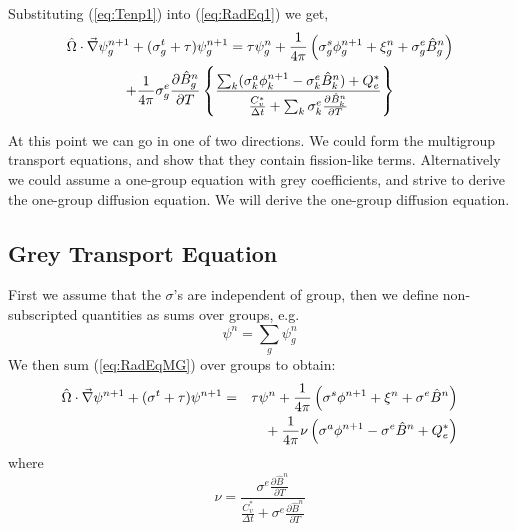 \documentclass{article}
\newcommand{\dt}{\ensuremath{\Delta t}}
\newcommand{\Cvs}{\ensuremath{C_{v}^{*}}}
\newcommand{\Bn}{\ensuremath{\hat{B}^{n}}}
\newcommand{\pBndT}{\ensuremath{\frac{\partial\Bn}{\partial T}}}
\newcommand{\Bgn}{\ensuremath{\hat{B}_{g}^{n}}}
\newcommand{\pBgndT}{\ensuremath{\frac{\partial\Bgn}{\partial T}}}
\newcommand{\Bkn}{\ensuremath{\hat{B}_{k}^{n}}}
\newcommand{\pBkndT}{\ensuremath{\frac{\partial\Bkn}{\partial T}}}
\begin{document}
Substituting (\ref{eq:Tenp1}) into (\ref{eq:RadEq1}) we get,
\begin{multline}
\hat{\Omega} \cdot \del \psi^{n+1}_{g} + (\sigma^{t}_{g} + \tau) \psi^{n+1}_{g}
        =
         \tau \psi_{g}^{n}
        + \frac{1}{4\pi} \left(
                \sigma^{s}_{g} \phi^{n+1}_{g}
                + \xi_{g}^{n}
                + \sigma^{e}_{g} \Bgn \right)
        \\
        + \frac{1}{4\pi} \sigma^{e}_{g} \pBgndT
                \left\{ \frac{\sum_{k} (\sigma_{k}^{a}\phi_{k}^{n+1} 
                                        - \sigma_{k}^{e}\Bkn) + Q_{e}^{*}}
                             {\frac{\Cvs}{\dt} + \sum_{k} \sigma_{k}^{e}\pBkndT}
                \right\}
\label{eq:RadEqMG}
\end{multline}

At this point we can go in one of two directions.  We could form the
multigroup transport equations, and show that they contain fission-like terms.
Alternatively we could assume a one-group equation
with grey coefficients, and strive to derive the
one-group diffusion equation.  We will derive the one-group diffusion equation.

\subsection{Grey Transport Equation}

First we assume that the $\sigma$'s are independent of group, then
we define non-subscripted quantities as sums over groups, e.g.
\begin{equation}
        \psi^{n} = \sum_{g} \psi_{g}^{n}
\end{equation}
We then sum (\ref{eq:RadEqMG}) over groups to obtain:
\begin{eqnarray}
\hat{\Omega} \cdot \del \psi^{n+1} + (\sigma^{t} + \tau) \psi^{n+1}
        &=& \tau \psi^{n}
        + \frac{1}{4\pi} \left( \sigma^{s} \phi^{n+1}
                        + \xi^{n}
                        + \sigma^{e} \Bn \right)
        \nonumber \\
        & & \mbox{}
        + \frac{1}{4\pi} \nu \left( \sigma^{a}\phi^{n+1}
                                        - \sigma^{e}\Bn + Q_{e}^{*}\right)
\label{eq:RadEqGrey}
\end{eqnarray}
where
\begin{equation}
        \nu = \frac{\sigma^{e} \pBndT } {\frac{\Cvs}{\dt} + \sigma^{e}\pBndT}
\end{equation}
\end{document}
